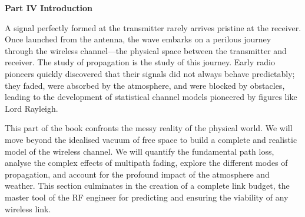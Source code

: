 \newpage
\thispagestyle{empty}

\vspace*{3cm}

\begin{center}
{\Large\lorettadisplay\bfseries Part IV Introduction}
\end{center}

\vspace{2cm}

A signal perfectly formed at the transmitter rarely arrives pristine at the receiver. Once launched from the antenna, the wave embarks on a perilous journey through the wireless channel---the physical space between the transmitter and receiver. The study of propagation is the study of this journey. Early radio pioneers quickly discovered that their signals did not always behave predictably; they faded, were absorbed by the atmosphere, and were blocked by obstacles, leading to the development of statistical channel models pioneered by figures like Lord Rayleigh.

\vspace{1em}

This part of the book confronts the messy reality of the physical world. We will move beyond the idealised vacuum of free space to build a complete and realistic model of the wireless channel. We will quantify the fundamental path loss, analyse the complex effects of multipath fading, explore the different modes of propagation, and account for the profound impact of the atmosphere and weather. This section culminates in the creation of a complete link budget, the master tool of the RF engineer for predicting and ensuring the viability of any wireless link.

\vspace*{\fill}
\newpage
